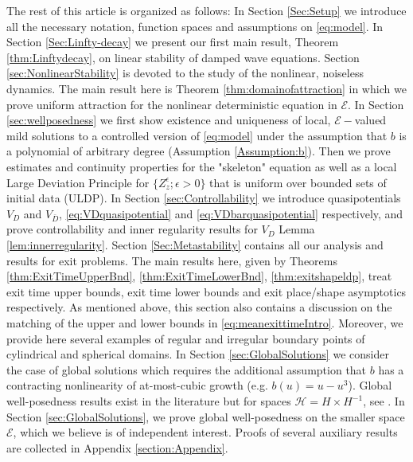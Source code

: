 \documentclass[10pt, reqno]{amsart}
\newcommand{\h}{\mathcal{H}}
\newcommand{\e}{\mathcal{E}}
\theoremstyle{definition}
\numberwithin{lem}{section}
\numberwithin{cor}{section}
\numberwithin{prop}{section}
\numberwithin{thm}{section}
\numberwithin{dfn}{section}
\begin{document}
    The rest of this article is organized as follows: In Section \ref{Sec:Setup} we introduce all the necessary notation, function spaces and assumptions on \eqref{eq:model}. In Section \ref{Sec:Linfty-decay} we present our first main result, Theorem \ref{thm:Linftydecay}, on linear stability of damped wave equations. Section \ref{sec:NonlinearStability} is devoted to the study of the nonlinear, noiseless dynamics. The main result here is Theorem \ref{thm:domainofattraction} in which we prove uniform attraction for the nonlinear deterministic equation in $\e.$ In Section \ref{sec:wellposedness} we first show existence and uniqueness of local, $\e-$valued mild solutions
 to a controlled version of \eqref{eq:model} under the assumption that $b$ is a polynomial of arbitrary degree (Assumption \ref{Assumption:b}). Then we prove estimates and continuity properties for the "skeleton" equation as well as a local Large Deviation Principle for $\{Z_z^\epsilon;\epsilon>0\}$ that is uniform over bounded sets of initial data (ULDP). In Section \ref{sec:Controllability} we introduce  quasipotentials $V_D$  and $V_{\bar{D}}$, \eqref{eq:VDquasipotential} and \eqref{eq:VDbarquasipotential} respectively, and prove controllability and inner regularity results for $V_D$ Lemma \ref{lem:innerregularity}. Section \ref{Sec:Metastability} contains all our analysis and results for exit problems. The main results here, given by Theorems \ref{thm:ExitTimeUpperBnd}, \ref{thm:ExitTimeLowerBnd}, \ref{thm:exitshapeldp}, treat exit time upper bounds, exit time lower bounds and exit place/shape asymptotics respectively. As mentioned above, this section also contains a discussion on the matching of the upper and lower bounds in \eqref{eq:meanexittimeIntro}. Moreover, we provide here several examples of regular and irregular boundary points of cylindrical and spherical domains. In Section \ref{sec:GlobalSolutions} we consider the case of global solutions which requires the additional assumption that $b$ has a contracting nonlinearity of at-most-cubic growth (e.g. $b(u)=u-u^3$). Global well-posedness results exist in the literature but for spaces  $\h=H\times H^{-1}$, see \cite{cerrai2003stochastic,cerrai2006smoluchowski}. 
 In Section \ref{sec:GlobalSolutions}, we prove global well-posedness on the smaller space $\e$, which we believe is of independent interest.
     Proofs of several auxiliary results are collected in Appendix \ref{section:Appendix}.
    
    

     

     
	    
\end{document}
